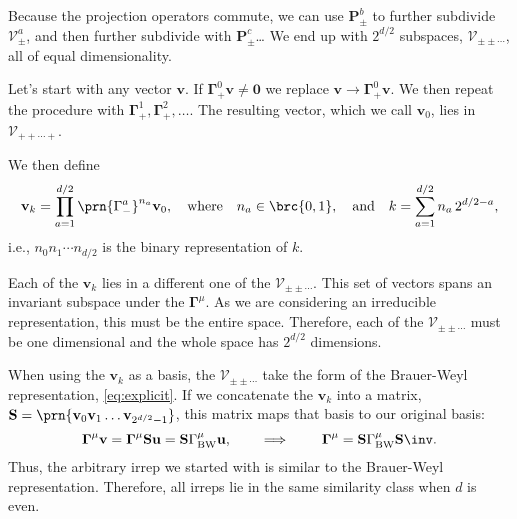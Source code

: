 \documentclass[11pt]{article}
\newcommand{\Gammab}{\boldsymbol{\Gamma}}
\renewcommand{\S}{\mathbf{S}}
\begin{document}
\begin{appendix}
Because the projection operators commute, we can use \(\mathbf{P}^b_\pm\) to further subdivide \(\mathcal{V}^a_\pm\), and then further subdivide with \(\mathbf{P}^c_\pm\)\dots
We end up with \(2^{d/2}\) subspaces, \(\mathcal{V}_{\pm\pm\cdots}\), all of equal dimensionality. 

Let's start with any vector \(\mathbf{v}\). 
If \(\Gammab^0_+ \mathbf{v} \neq \mathbf{0}\) we replace \(\mathbf{v} \to \Gammab^0_+ \mathbf{v}\).
We then repeat the procedure with \(\Gammab^1_+,\Gammab^2_+,\dots\).
The resulting vector, which we call \(\mathbf{v}_0\), lies in \(\mathcal{V}_{++\cdots+}\).

We then define
%
\begin{equation*}
  \mathbf{v}_k = \prod_{a=1}^{d/2} \prn{\Gamma^a_-}^{n_a} \mathbf{v}_0,
  \quad \text{where}\quad
  n_a \in \brc{0,1},
  \quad \text{and}\quad
  k = \sum_{a=1}^{d/2} n_a \, 2^{d/2 - a},
\end{equation*}
%
i.e., \( n_0 n_1 \cdots n_{d/2} \) is the binary representation of \(k\).

Each of the \(\mathbf{v}_k\) lies in a different one of the \(\mathcal{V}_{\pm\pm\cdots}\).
This set of vectors spans an invariant subspace under the \(\Gammab^\mu\).
As we are considering an irreducible representation, this must be the entire space.
Therefore, each of the \(\mathcal{V}_{\pm\pm\cdots}\) must be one dimensional and the whole space has \(2^{d/2}\) dimensions.

When using the \(\mathbf{v}_k\) as a basis, the \(\mathcal{V}_{\pm\pm\cdots}\) take the form of the Brauer-Weyl representation, \cref{eq:explicit}.
If we concatenate the \(\mathbf{v}_k\) into a matrix, \( \S = \prn{ \mathbf{v}_0 \mathbf{v}_1 \dots \mathbf{v}_{2^{d/2}-1} }\), this matrix maps that basis to our original basis:
%
\begin{equation}\label{eq:similarBW}
  \Gammab^\mu \mathbf{v}
    = \Gammab^\mu \S \mathbf{u}
    = \S \Gamma^\mu_\text{BW} \mathbf{u},
  \qquad \implies \qquad
  \Gammab^\mu = \S \Gamma^\mu_\text{BW} \S\inv.
\end{equation}
%
Thus, the arbitrary irrep we started with is similar to the Brauer-Weyl representation.
Therefore, all irreps lie in the same similarity class when \(d\) is even.


\end{appendix}


\end{document}
